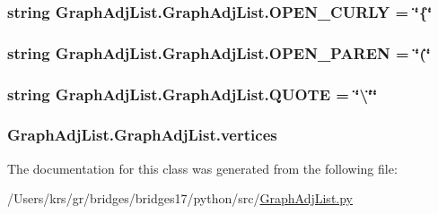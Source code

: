 \subsubsection[{O\+P\+E\+N\+\_\+\+C\+U\+R\+L\+Y}]{\setlength{\rightskip}{0pt plus 5cm}string Graph\+Adj\+List.\+Graph\+Adj\+List.\+O\+P\+E\+N\+\_\+\+C\+U\+R\+L\+Y = \char`\"{}\{\char`\"{}\hspace{0.3cm}{\ttfamily [static]}}\label{class_graph_adj_list_1_1_graph_adj_list_a55b37931a5f3113f12f2f48a7cfc2697}
\hypertarget{class_graph_adj_list_1_1_graph_adj_list_a3aca6e4357896f9c5b9316eacdd2e8ed}{}
\subsubsection[{O\+P\+E\+N\+\_\+\+P\+A\+R\+E\+N}]{\setlength{\rightskip}{0pt plus 5cm}string Graph\+Adj\+List.\+Graph\+Adj\+List.\+O\+P\+E\+N\+\_\+\+P\+A\+R\+E\+N = \char`\"{}(\char`\"{}\hspace{0.3cm}{\ttfamily [static]}}\label{class_graph_adj_list_1_1_graph_adj_list_a3aca6e4357896f9c5b9316eacdd2e8ed}
\hypertarget{class_graph_adj_list_1_1_graph_adj_list_ae489d4c9c6cb6a63bb665b2e0e581424}{}
\subsubsection[{Q\+U\+O\+T\+E}]{\setlength{\rightskip}{0pt plus 5cm}string Graph\+Adj\+List.\+Graph\+Adj\+List.\+Q\+U\+O\+T\+E = \char`\"{}\textbackslash{}\char`\"{}\char`\"{}\hspace{0.3cm}{\ttfamily [static]}}\label{class_graph_adj_list_1_1_graph_adj_list_ae489d4c9c6cb6a63bb665b2e0e581424}
\hypertarget{class_graph_adj_list_1_1_graph_adj_list_a47f4552a36c0fdc7d7599a7b5b47177d}{}
\subsubsection[{vertices}]{\setlength{\rightskip}{0pt plus 5cm}Graph\+Adj\+List.\+Graph\+Adj\+List.\+vertices}\label{class_graph_adj_list_1_1_graph_adj_list_a47f4552a36c0fdc7d7599a7b5b47177d}


The documentation for this class was generated from the following file\+:\begin{DoxyCompactItemize}
\item 
/\+Users/krs/gr/bridges/bridges17/python/src/\hyperlink{_graph_adj_list_8py}{Graph\+Adj\+List.\+py}\end{DoxyCompactItemize}
